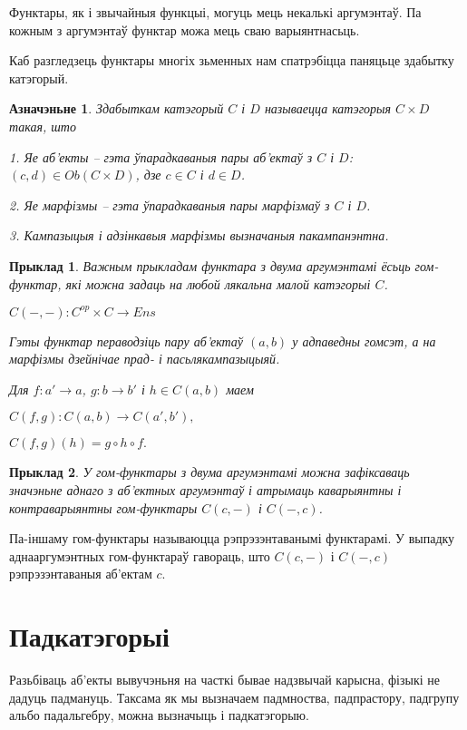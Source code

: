 \documentclass[a4paper,12pt]{book}
\newtheorem{example}{Прыклад}[section]
\newtheorem{definition}{Азначэньне}[section]
\begin{document}
Функтары, як і звычайныя функцыі, могуць мець некалькі аргумэнтаў. Па
кожным з аргумэнтаў функтар можа мець сваю варыянтнасьць.

Каб разгледзець функтары многіх зьменных нам спатрэбіцца паняцьце
здабытку катэгорый.

\begin{definition}
  Здабыткам катэгорый $C$ і $D$ называецца катэгорыя $C \times D$
  такая, што

  1. Яе аб'екты -- гэта ўпарадкаваныя пары аб'ектаў з $C$ і $D$: $(c,
  d) \in Ob(C \times D)$, дзе $c \in C$ і $d \in D$.

  2. Яе марфізмы -- гэта ўпарадкаваныя пары марфізмаў з $C$ і $D$.

  3. Кампазыцыя і адзінкавыя марфізмы вызначаныя пакампанэнтна.
\end{definition}

\begin{example}
  Важным прыкладам функтара з двума аргумэнтамі ёсьць гом-функтар, які
  можна задаць на любой лякальна малой катэгорыі $C$.

  $C(-, -): C^{op} \times C \rightarrow Ens$

  Гэты функтар пераводзіць пару аб'ектаў $(a, b)$ у адпаведны гомсэт,
  а на марфізмы дзейнічае прад- і пасьлякампазыцыяй.

  Для $f: a' \rightarrow a$, $g: b \rightarrow b'$ і $h \in C(a, b)$
  маем

  $C(f, g): C(a, b) \rightarrow C(a', b'),$

  $C(f, g)(h) = g \circ h \circ f.$
\end{example}

\begin{example}
  У гом-функтары з двума аргумэнтамі можна зафіксаваць значэньне аднаго
  з аб'ектных аргумэнтаў і атрымаць каварыянтны і контраварыянтны
  гом-функтары $C(c, -)$ і $C(-, c)$.
\end{example}

Па-іншаму гом-функтары называюцца рэпрэзэнтаванымі функтарамі. У
выпадку аднааргумэнтных гом-функтараў гавораць, што $C(c, -)$ і $C(-,
c)$ рэпрэзэнтаваныя аб'ектам $c$.

\section{Падкатэгорыі}

Разьбіваць аб'екты вывучэньня на часткі бывае надзвычай карысна,
фізыкі не дадуць падмануць. Таксама як мы вызначаем падмноства,
падпрастору, падгрупу альбо падальгебру, можна вызначыць і
падкатэгорыю.
\end{document}
